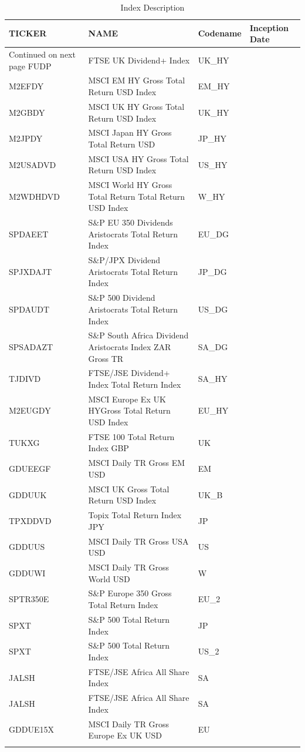 \documentclass[12pt,preprint, authoryear]{elsarticle}
\numberwithin{equation}{section}
\numberwithin{figure}{section}
\numberwithin{table}{section}
\begin{document}
\begingroup\fontsize{8pt}{9pt}\selectfont
\begin{longtable}{llll}
  \toprule
TICKER & NAME & Codename & Inception Date \\ 
  \hline 
\endhead 
\hline 
{\footnotesize Continued on next page} 
\endfoot 
\endlastfoot 
 \midrule
FUDP & FTSE UK Dividend+ Index & UK\_HY &  \\ 
  M2EFDY & MSCI EM HY Gross Total Return USD Index & EM\_HY &  \\ 
  M2GBDY & MSCI UK HY Gross Total Return USD Index & UK\_HY &  \\ 
  M2JPDY & MSCI Japan HY Gross Total Return USD & JP\_HY &  \\ 
  M2USADVD & MSCI USA HY Gross Total Return USD Index & US\_HY &  \\ 
  M2WDHDVD & MSCI World HY Gross Total Return Total Return USD Index & W\_HY &  \\ 
  SPDAEET & S\&P EU 350 Dividends Aristocrats Total Return Index & EU\_DG &  \\ 
  SPJXDAJT & S\&P/JPX Dividend Aristocrats Total Return Index & JP\_DG &  \\ 
  SPDAUDT & S\&P 500 Dividend Aristocrats Total Return Index & US\_DG &  \\ 
  SPSADAZT & S\&P South Africa Dividend Aristocrats Index ZAR Gross TR & SA\_DG &  \\ 
  TJDIVD & FTSE/JSE Dividend+ Index Total Return Index & SA\_HY &  \\ 
  M2EUGDY & MSCI Europe Ex UK HYGross Total Return USD Index & EU\_HY &  \\ 
  TUKXG & FTSE 100 Total Return Index GBP & UK &  \\ 
  GDUEEGF & MSCI Daily TR Gross EM USD & EM &  \\ 
  GDDUUK & MSCI UK Gross Total Return USD Index & UK\_B &  \\ 
  TPXDDVD & Topix Total Return Index JPY & JP &  \\ 
  GDDUUS & MSCI Daily TR Gross USA USD & US &  \\ 
  GDDUWI & MSCI Daily TR Gross World USD & W &  \\ 
  SPTR350E & S\&P Europe 350 Gross Total Return Index & EU\_2 &  \\ 
  SPXT & S\&P 500 Total Return Index & JP &  \\ 
  SPXT & S\&P 500 Total Return Index & US\_2 &  \\ 
  JALSH & FTSE/JSE Africa All Share Index & SA &  \\ 
  JALSH & FTSE/JSE Africa All Share Index & SA &  \\ 
  GDDUE15X & MSCI Daily TR Gross Europe Ex UK USD & EU &  \\ 
   \bottomrule
\caption{Index Description \label{indexdes}} 
\end{longtable}
\endgroup


\end{document}
